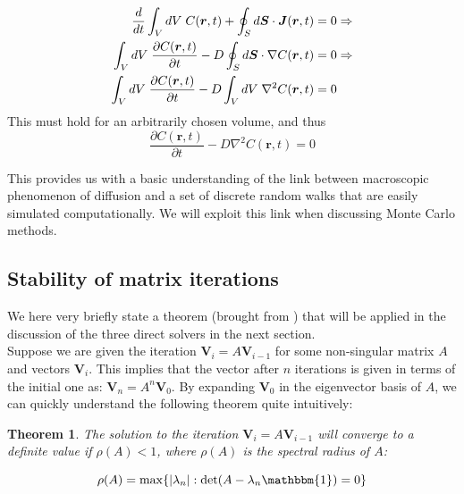 \documentclass[a4paper, 11pt, notitlepage,english]{article}
\newcommand{\id}{\mathbbm{1}}
\newtheorem{theorem}{Theorem}
\begin{document}
\begin{align}
 \frac{d}{dt} \int_V dV \hspace{1mm} C(\boldsymbol{r},t) + \oint_S d\boldsymbol{S} \cdot \boldsymbol{J}(\boldsymbol{r},t) &=0 \Rightarrow \\
 \int_V dV \hspace{1mm} \frac{\partial C(\boldsymbol{r},t)}{\partial t} -D\oint_S d\boldsymbol{S} \cdot \nabla C(\boldsymbol{r},t) &=0 \Rightarrow \\
  \int_V dV \hspace{1mm} \frac{\partial C(\boldsymbol{r},t)}{\partial t}  -D\int_V dV \hspace{1mm} \nabla^2 C(\boldsymbol{r},t) &=0
\end{align}
This must hold for an arbitrarily chosen volume, and thus
\begin{equation}
\frac{\partial C(\boldsymbol{r},t)}{\partial t} - D \nabla^2 C(\boldsymbol{r},t) = 0
\label{eq:Diffusion_Gauss_theorem}
\end{equation}

This provides us with a basic understanding of the link between macroscopic phenomenon of diffusion  and 
a set of  discrete random walks that are easily simulated computationally. We will exploit this link when discussing Monte Carlo methods.


\subsection{Stability of matrix iterations}
\label{sec:Stability}
We here very briefly state a theorem (brought from \cite{Komp3150}) that will be applied in the discussion of the three direct solvers in the next section. \\

Suppose we are given the iteration $\boldsymbol{V}_i = A \boldsymbol{V}_{i-1}$ for some non-singular matrix $A$ and vectors $\boldsymbol{V}_i$. This implies that the vector after $n$ iterations is given in terms of the initial one as: $\boldsymbol{V}_n = A^n \boldsymbol{V}_0$. By expanding $\boldsymbol{V}_0$ in the eigenvector basis of $A$, we can quickly understand the following theorem quite intuitively: \\

\begin{theorem}
The solution to the iteration $\boldsymbol{V}_i = A \boldsymbol{V}_{i-1}$ will converge to a definite value if $\rho(A) < 1$, where $\rho(A)$ is the spectral radius of $A$:

\begin{equation}
\rho(A) = \mathrm{max}\{\lvert \lambda_n \rvert : \mathrm{det}(A-\lambda_n\id)=0 \}
\label{eq:Spectral_radius}
\end{equation}
\end{theorem}
\end{document}
